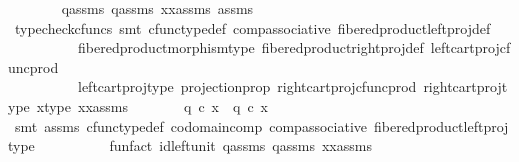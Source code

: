 \begin{isabellebody}
\ \ \ \ \ \ \isamarkupfalse%
\ q{}{\isacharunderscore}{\kern0pt}assms\ q{}{\isacharunderscore}{\kern0pt}assms\ xx{\isacharunderscore}{\kern0pt}assms\ assms\ \isanewline
\ \ \ \ \ \ \isamarkupfalse%
\ {\isacharparenleft}{\kern0pt}typecheck{\isacharunderscore}{\kern0pt}cfuncs{\isacharcomma}{\kern0pt}\ smt\ cfunc{\isacharunderscore}{\kern0pt}type{\isacharunderscore}{\kern0pt}def\ comp{\isacharunderscore}{\kern0pt}associative{}\ fibered{\isacharunderscore}{\kern0pt}product{\isacharunderscore}{\kern0pt}left{\isacharunderscore}{\kern0pt}proj{\isacharunderscore}{\kern0pt}def\isanewline
\ \ \ \ \ \ \ \ \ \ fibered{\isacharunderscore}{\kern0pt}product{\isacharunderscore}{\kern0pt}morphism{\isacharunderscore}{\kern0pt}type\ fibered{\isacharunderscore}{\kern0pt}product{\isacharunderscore}{\kern0pt}right{\isacharunderscore}{\kern0pt}proj{\isacharunderscore}{\kern0pt}def\ left{\isacharunderscore}{\kern0pt}cart{\isacharunderscore}{\kern0pt}proj{\isacharunderscore}{\kern0pt}cfunc{\isacharunderscore}{\kern0pt}prod\isanewline
\ \ \ \ \ \ \ \ \ \ left{\isacharunderscore}{\kern0pt}cart{\isacharunderscore}{\kern0pt}proj{\isacharunderscore}{\kern0pt}type\ projection{\isacharunderscore}{\kern0pt}prop\ right{\isacharunderscore}{\kern0pt}cart{\isacharunderscore}{\kern0pt}proj{\isacharunderscore}{\kern0pt}cfunc{\isacharunderscore}{\kern0pt}prod\ right{\isacharunderscore}{\kern0pt}cart{\isacharunderscore}{\kern0pt}proj{\isacharunderscore}{\kern0pt}type\ x{\isacharunderscore}{\kern0pt}type\ xx{\isacharunderscore}{\kern0pt}assms{\isacharparenleft}{\kern0pt}{}{\isacharparenright}{\kern0pt}{\isacharparenright}{\kern0pt}\isanewline
\ \ \ \ \isamarkupfalse%
\ \isamarkupfalse%
\ {\isachardoublequoteopen}q{}\ {\isasymcirc}\isactrlsub c\ x\ {\isacharequal}{\kern0pt}\ q{}\ {\isasymcirc}\isactrlsub c\ x{\isachardoublequoteclose}\ \ \ \ \ \ \isanewline
\ \ \ \ \ \ \isamarkupfalse%
\ {\isacharparenleft}{\kern0pt}smt\ assms{\isacharparenleft}{\kern0pt}{}{\isacharparenright}{\kern0pt}\ cfunc{\isacharunderscore}{\kern0pt}type{\isacharunderscore}{\kern0pt}def\ codomain{\isacharunderscore}{\kern0pt}comp\ comp{\isacharunderscore}{\kern0pt}associative\ fibered{\isacharunderscore}{\kern0pt}product{\isacharunderscore}{\kern0pt}left{\isacharunderscore}{\kern0pt}proj{\isacharunderscore}{\kern0pt}type\isanewline
\ \ \ \ \ \ \ \ \ \ fun{\isacharunderscore}{\kern0pt}fact\ id{\isacharunderscore}{\kern0pt}left{\isacharunderscore}{\kern0pt}unit{}\ q{}{\isacharunderscore}{\kern0pt}assms\ q{}{\isacharunderscore}{\kern0pt}assms\ xx{\isacharunderscore}{\kern0pt}assms{\isacharparenright}{\kern0pt}\isanewline

\end{isabellebody}
